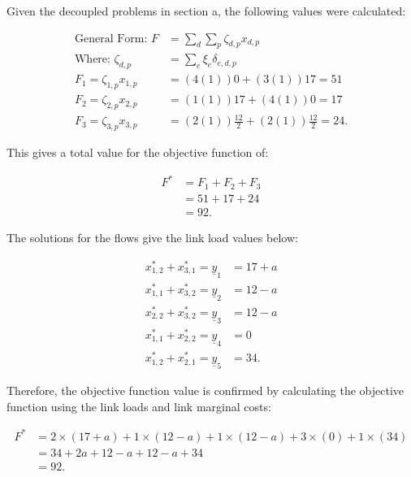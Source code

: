 Given the decoupled problems in section a, the following values were calculated:

\begin{align*}
	\text{General Form: } F &= \sum_{d}\sum_{p}\zeta_{d,p}x_{d,p}\\
	\text{Where: } \zeta_{d,p} &= \sum_e\xi_{e}\delta_{e,d,p} \\
	F_1 = \zeta_{1,p}x_{1,p} &= (4(1))0+(3(1))17 = 51 \\
	F_2 = \zeta_{2,p}x_{2,p} &= (1(1))17+(4(1))0 = 17 \\
	F_3 = \zeta_{3,p}x_{3,p} &= (2(1))\frac{12}{2}+(2(1))\frac{12}{2} = 24
.\end{align*}

This gives a total value for the objective function of:

\begin{align*}
	F^* &= F_1 + F_2 +F_3 \\
	    &= 51 + 17 + 24 \\
	    &= 92
.\end{align*}

The solutions for the flows give the link load values below:

\begin{align*}
	x^*_{1,2} + x^*_{3,1} = \underline{y}_1 &= 17 + a \\
	x^*_{1,1} + x^*_{3,2} = \underline{y}_2 &= 12 - a \\
	x^*_{2,2} + x^*_{3,2} = \underline{y}_3 &= 12 - a \\
	x^*_{1,1} + x^*_{2,2} = \underline{y}_4 &= 0 \\
	x^*_{1,2} + x^*_{2,1} = \underline{y}_5 &= 34
.\end{align*}

Therefore, the objective function value is confirmed by calculating the objective function using the link loads and
link marginal costs:

\begin{align*}
	F^* &= 2\times(17+a) + 1\times(12-a) + 1\times(12-a) + 3\times(0) +
	1\times(34)\\
	    &= 34 + 2a + 12 - a + 12 - a + 34\\
	    &= 92
.\end{align*}

